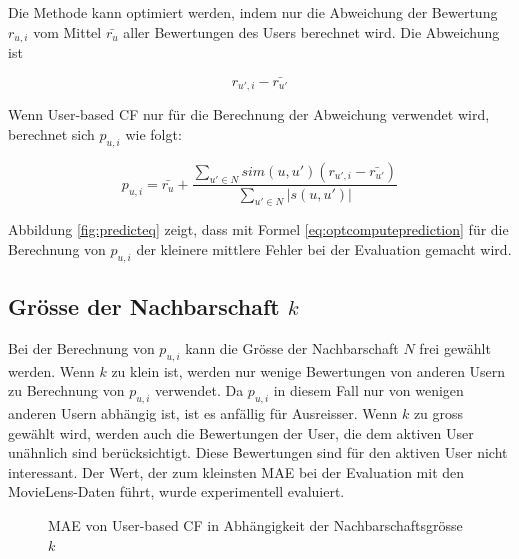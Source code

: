 \documentclass[a4paper, 12pt]{article}
\begin{document}
Die Methode kann optimiert werden, indem nur die Abweichung der Bewertung $r_{u,i}$ vom Mittel $\bar{r_u}$  aller Bewertungen des Users berechnet wird. Die Abweichung ist

\begin{equation}
  \label{eq:dev2}
r_{u',i} - \bar{r_{u'}}
\end{equation}

Wenn User-based CF nur für die Berechnung der Abweichung verwendet wird, berechnet sich $p_{u,i}$ wie folgt:

\begin{equation}
  \label{eq:optcomputeprediction}
  p_{u,i} = \bar{r_u} + \frac{\sum_{u' \in N}{sim(u,u') (r_{u',i} - \bar{r_{u'}})}}{\sum_{u' \in N}{|s(u,u')|}}
\end{equation}

Abbildung \ref{fig:predicteq} zeigt, dass mit Formel \ref{eq:optcomputeprediction} für die Berechnung von $p_{u,i}$ der kleinere mittlere Fehler bei der Evaluation gemacht wird.

\subsection{Grösse der Nachbarschaft $k$}
\label{sec:neighborhoodsize}

Bei der Berechnung von $p_{u,i}$ kann die Grösse der Nachbarschaft $N$ frei gewählt werden. Wenn $k$ zu klein ist, werden nur wenige Bewertungen von anderen Usern zu Berechnung von $p_{u,i}$ verwendet. Da $p_{u,i}$ in diesem Fall nur von wenigen anderen Usern abhängig ist, ist es anfällig für Ausreisser. Wenn $k$ zu gross gewählt wird, werden auch die Bewertungen der User, die dem aktiven User unähnlich sind berücksichtigt. Diese Bewertungen sind für den aktiven User nicht interessant. Der Wert, der zum kleinsten MAE bei der Evaluation mit den MovieLens-Daten führt, wurde experimentell evaluiert.

\begin{figure}
  \centering
{}

\caption{MAE von User-based CF in Abhängigkeit der Nachbarschaftsgrösse $k$ }
\label{fig:nrofneighbors1}
\end{figure}
\end{document}
